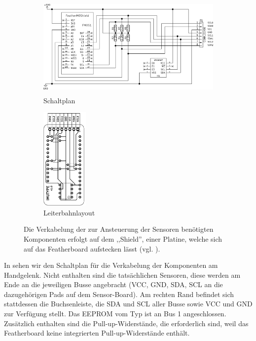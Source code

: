 \begin{figure}
    \centering
    \begin{subfigure}[b]{0.6\textwidth}
        \centering
        \includegraphics[height=5cm]{../common/images/shield-schematics}
        \caption{Schaltplan}
    \end{subfigure}
    \hfill
    \begin{subfigure}[b]{0.3\textwidth}
        \centering
        \includegraphics[height=5cm]{../common/images/shield-board}
        \caption{Leiterbahnlayout}
    \end{subfigure}

    \caption[Schaltplan und Leiterbahnlayout des Shields]{Die Verkabelung der zur Ansteuerung der Sensoren benötigten
    Komponenten erfolgt auf dem ,,Shield'', einer Platine, welche sich auf das
    Featherboard aufstecken lässt (vgl. ).}
\end{figure}


In  sehen wir den Schaltplan für die Verkabelung der
Komponenten am Handgelenk. Nicht enthalten sind die tatsächlichen Sensoren,
diese werden am Ende an die jeweiligen Busse angebracht (VCC, GND, SDA, SCL an
die dazugehörigen Pads auf dem Sensor-Board). Am rechten Rand befindet sich
stattdessen die Buchsenleiste, die SDA und SCL aller Busse sowie VCC und GND
zur Verfügung stellt. Das EEPROM vom Typ  ist an Bus 1
angeschlossen. Zusätzlich enthalten sind die Pull-up-Widerstände, die
erforderlich sind, weil das Featherboard keine integrierten Pull-up-Widerstände
enthält.

